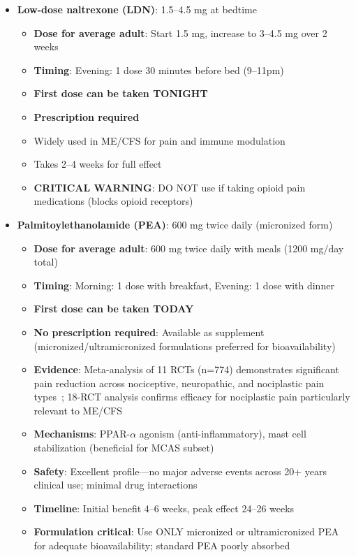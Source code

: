 \begin{enumerate}
\begin{itemize}
        \item \textbf{Low-dose naltrexone (LDN)}: 1.5--4.5 mg at bedtime
        \begin{itemize}
            \item \textbf{Dose for average adult}: Start 1.5 mg, increase to 3--4.5 mg over 2 weeks
            \item \textbf{Timing}: Evening: 1 dose 30 minutes before bed (9--11pm)
            \item \textbf{First dose can be taken TONIGHT}
            \item \textbf{Prescription required}
            \item Widely used in ME/CFS for pain and immune modulation
            \item Takes 2--4 weeks for full effect
            \item \textbf{CRITICAL WARNING}: DO NOT use if taking opioid pain medications (blocks opioid receptors)
        \end{itemize}

        \item \textbf{Palmitoylethanolamide (PEA)}: 600 mg twice daily (micronized form)
        \begin{itemize}
            \item \textbf{Dose for average adult}: 600 mg twice daily with meals (1200 mg/day total)
            \item \textbf{Timing}: Morning: 1 dose with breakfast, Evening: 1 dose with dinner
            \item \textbf{First dose can be taken TODAY}
            \item \textbf{No prescription required}: Available as supplement (micronized/ultramicronized formulations preferred for bioavailability)
            \item \textbf{Evidence}: Meta-analysis of 11 RCTs (n=774) demonstrates significant pain reduction across nociceptive, neuropathic, and nociplastic pain types~\cite{LangIlievich2023pea}; 18-RCT analysis confirms efficacy for nociplastic pain particularly relevant to ME/CFS~\cite{Vina2025pea}
            \item \textbf{Mechanisms}: PPAR-$\alpha$ agonism (anti-inflammatory), mast cell stabilization (beneficial for MCAS subset)~\cite{Petrosino2019pea}
            \item \textbf{Safety}: Excellent profile---no major adverse events across 20+ years clinical use; minimal drug interactions
            \item \textbf{Timeline}: Initial benefit 4--6 weeks, peak effect 24--26 weeks
            \item \textbf{Formulation critical}: Use ONLY micronized or ultramicronized PEA for adequate bioavailability; standard PEA poorly absorbed
        \end{itemize}
    \end{itemize}


\end{enumerate}
